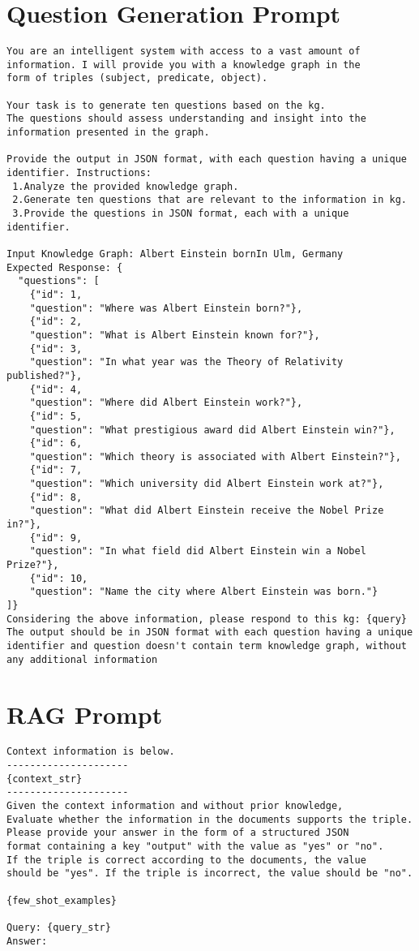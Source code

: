\section{Question Generation Prompt}\label{sec:prompt-templates:10-question}
\begin{Verbatim}[fontsize=\small, frame=single, label={Prompt template for generating 10 questions for each triple}]
You are an intelligent system with access to a vast amount of
information. I will provide you with a knowledge graph in the
form of triples (subject, predicate, object).

Your task is to generate ten questions based on the kg.
The questions should assess understanding and insight into the
information presented in the graph.

Provide the output in JSON format, with each question having a unique
identifier. Instructions:
 1.Analyze the provided knowledge graph.
 2.Generate ten questions that are relevant to the information in kg.
 3.Provide the questions in JSON format, each with a unique identifier.

Input Knowledge Graph: Albert Einstein bornIn Ulm, Germany
Expected Response: {
  "questions": [
    {"id": 1,
    "question": "Where was Albert Einstein born?"},
    {"id": 2,
    "question": "What is Albert Einstein known for?"},
    {"id": 3,
    "question": "In what year was the Theory of Relativity published?"},
    {"id": 4,
    "question": "Where did Albert Einstein work?"},
    {"id": 5,
    "question": "What prestigious award did Albert Einstein win?"},
    {"id": 6,
    "question": "Which theory is associated with Albert Einstein?"},
    {"id": 7,
    "question": "Which university did Albert Einstein work at?"},
    {"id": 8,
    "question": "What did Albert Einstein receive the Nobel Prize in?"},
    {"id": 9,
    "question": "In what field did Albert Einstein win a Nobel Prize?"},
    {"id": 10,
    "question": "Name the city where Albert Einstein was born."}
]}
Considering the above information, please respond to this kg: {query}
The output should be in JSON format with each question having a unique
identifier and question doesn't contain term knowledge graph, without
any additional information
\end{Verbatim}

\section{RAG Prompt}\label{sec:prompt-templates:rag}
\begin{Verbatim}[fontsize=\small, frame=single, label={Prompt template for RAG}]
Context information is below.
---------------------
{context_str}
---------------------
Given the context information and without prior knowledge,
Evaluate whether the information in the documents supports the triple.
Please provide your answer in the form of a structured JSON
format containing a key "output" with the value as "yes" or "no".
If the triple is correct according to the documents, the value
should be "yes". If the triple is incorrect, the value should be "no".

{few_shot_examples}

Query: {query_str}
Answer:
\end{Verbatim}

